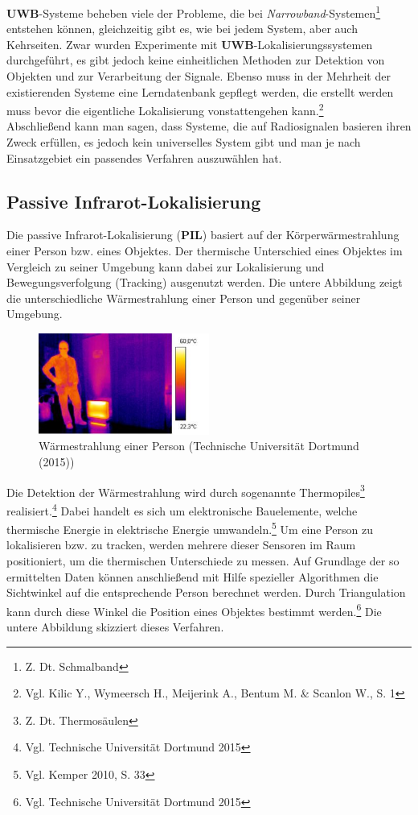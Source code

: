\textbf{UWB}-Systeme beheben viele der Probleme, die bei \textit{Narrowband}-Systemen\footnote{Z. Dt. Schmalband} entstehen können, gleichzeitig gibt es, wie bei jedem System, aber auch Kehrseiten. Zwar wurden Experimente mit \textbf{UWB}-Lokalisierungssystemen durchgeführt, es gibt jedoch keine einheitlichen Methoden zur Detektion von Objekten und zur Verarbeitung der Signale. Ebenso muss in der Mehrheit der existierenden Systeme eine Lerndatenbank gepflegt werden, die erstellt werden muss bevor die eigentliche Lokalisierung vonstattengehen kann.\footnote{Vgl. Kilic Y., Wymeersch H., Meijerink A., Bentum M. \& Scanlon W., S. 1}\\
Abschließend kann man sagen, dass Systeme, die auf Radiosignalen basieren ihren Zweck erfüllen, es jedoch kein universelles System gibt und man je nach Einsatzgebiet ein passendes Verfahren auszuwählen hat.


\subsection{Passive Infrarot-Lokalisierung}
Die passive Infrarot-Lokalisierung (\textbf{PIL}) basiert auf der Körperwärmestrahlung einer Person bzw. eines Objektes. Der thermische Unterschied eines Objektes im Vergleich zu seiner Umgebung kann dabei zur Lokalisierung und Bewegungsverfolgung (Tracking) ausgenutzt werden. Die untere Abbildung zeigt die unterschiedliche Wärmestrahlung einer Person und gegenüber seiner Umgebung.

\begin{figure}[H]
	\centering
	\includegraphics[width=0.5\textwidth]{pictures/pil1}
	\caption{Wärmestrahlung einer Person (Technische Universität Dortmund (2015))}
\end{figure}

Die Detektion der Wärmestrahlung wird durch sogenannte Thermopiles\footnote{Z. Dt. Thermosäulen}  realisiert.\footnote{Vgl. Technische Universität Dortmund 2015} Dabei handelt es sich um elektronische Bauelemente, welche thermische Energie in elektrische Energie umwandeln.\footnote{Vgl. Kemper 2010, S. 33} Um eine Person zu lokalisieren bzw. zu tracken, werden mehrere dieser Sensoren im Raum positioniert, um die thermischen Unterschiede zu messen. Auf Grundlage der so ermittelten Daten können anschließend mit Hilfe spezieller Algorithmen die Sichtwinkel auf die entsprechende Person berechnet werden. Durch Triangulation kann durch diese Winkel die Position eines Objektes bestimmt werden.\footnote{Vgl. Technische Universität Dortmund 2015} Die untere Abbildung skizziert dieses Verfahren.

